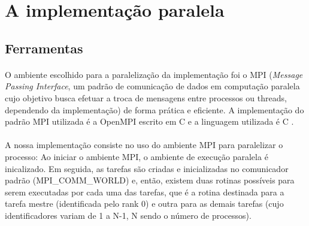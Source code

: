 \documentclass[a4paper,10pt]{article}
\begin{document}
\newpage

\section{A implementação paralela}
\subsection{Ferramentas}

\paragraph{}O ambiente escolhido para a paralelização da implementação foi o MPI (\emph{Message Passing Interface}, um padrão de comunicação de dados em computação paralela cujo objetivo busca efetuar a troca de mensagens entre processos ou threads, dependendo da implementação) de forma prática e eficiente. A implementação do padrão MPI utilizada é a OpenMPI \citep{gabriel2004open} escrito em C e a linguagem utilizada é C .\\
\paragraph{} A nossa implementação consiste no uso do ambiente MPI para paralelizar o processo: Ao iniciar o ambiente MPI, o ambiente de execução paralela é inicalizado. Em seguida, as tarefas são criadas e inicializadas no comunicador padrão (MPI\_COMM\_WORLD) e, então, existem duas rotinas possíveis para serem executadas por cada uma das tarefas, que é a rotina destinada para a tarefa mestre (identificada pelo rank 0) e outra para as demais tarefas (cujo identificadores variam de 1 a N-1, N sendo o número de processos).\\
\end{document}
